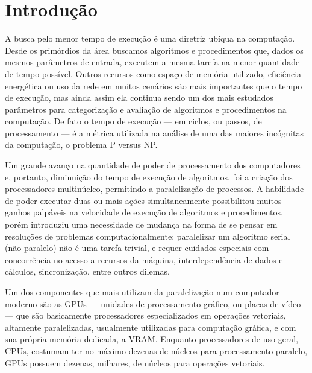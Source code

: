 \documentclass[12pt, %
openright, 
oneside, %
a4paper,    %
brazil]{facom-ufu-abntex2}
\begin{document}
\chapter{Introdução}

A busca pelo menor tempo de execução é uma diretriz ubíqua na computação. Desde os primórdios da área buscamos algoritmos e procedimentos que, dados os mesmos parâmetros de entrada, executem a mesma tarefa na menor quantidade de tempo possível. Outros recursos como espaço de memória utilizado, eficiência energética ou uso da rede em muitos cenários são mais importantes que o tempo de execução, mas ainda assim ela continua sendo um dos mais estudados parâmetros para categorização e avaliação de algoritmos e procedimentos na computação. De fato o tempo de execução --- em ciclos, ou passos, de processamento --- é a métrica utilizada na análise de uma das maiores incógnitas da computação, o problema P versus NP.


Um grande avanço na quantidade de poder de processamento dos computadores e, portanto, diminuição do tempo de execução de algoritmos, foi a criação dos processadores multinúcleo, permitindo a paralelização de processos. A habilidade de poder executar duas ou mais ações simultaneamente possibilitou muitos ganhos palpáveis na velocidade de execução de algoritmos e procedimentos, porém introduziu uma necessidade de mudança na forma de se pensar em resoluções de problemas computacionalmente: paralelizar um algoritmo serial (não-paralelo) não é uma tarefa trivial, e requer cuidados especiais com concorrência no acesso a recursos da máquina, interdependência de dados e cálculos, sincronização, entre outros dilemas.


Um dos componentes que mais utilizam da paralelização num computador moderno são as GPUs --- unidades de processamento gráfico, ou placas de vídeo --- que são basicamente processadores especializados em operações vetoriais, altamente paralelizadas, usualmente utilizadas para computação gráfica, e com sua própria memória dedicada, a VRAM. Enquanto processadores de uso geral, CPUs, costumam ter no máximo dezenas de núcleos para processamento paralelo, GPUs possuem dezenas, milhares, de núcleos para operações vetoriais.
\end{document}
